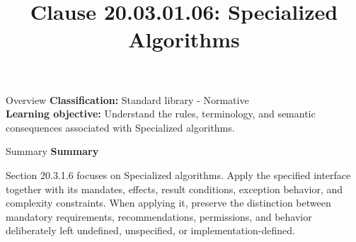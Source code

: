 \documentclass[10pt,letterpaper]{article}
\title{Clause 20.03.01.06: Specialized Algorithms}
\author{}
\date{}
\begin{document}
\maketitle
\begin{CornellOverviewBox}{Overview}
\textbf{Classification:} Standard library - Normative\\[2pt]
\textbf{Learning objective:} Understand the rules, terminology, and semantic consequences associated with Specialized algorithms.
\end{CornellOverviewBox}\begin{CornellSummaryBox}{Summary}
{\sffamily\bfseries\color{Accent} Summary}\par\vspace{3pt}Section 20.3.1.6 focuses on Specialized algorithms. Apply the specified interface together with its mandates, effects, result conditions, exception behavior, and complexity constraints. When applying it, preserve the distinction between mandatory requirements, recommendations, permissions, and behavior deliberately left undefined, unspecified, or implementation-defined.
\end{CornellSummaryBox}
\end{document}
